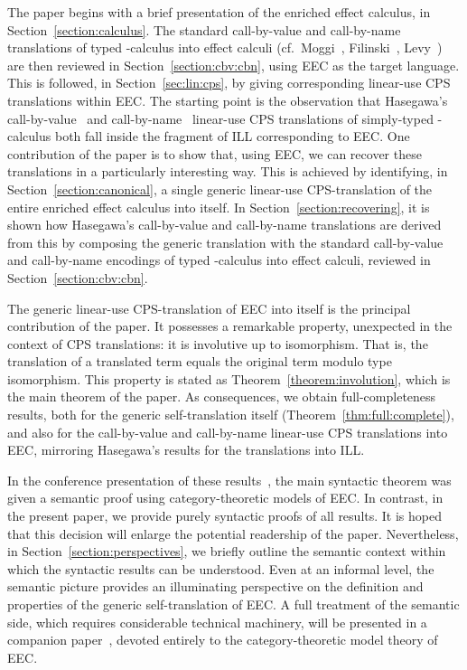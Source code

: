 \documentclass{LMCS}
\begin{document}
The paper 
begins with a brief presentation of the enriched effect
calculus, in Section~\ref{section:calculus}. 
The standard call-by-value and call-by-name translations of typed -calculus
into effect calculi (cf.~Moggi~\cite{Moggi:91},
Filinski~\cite{Filinski:phd}, Levy~\cite{Levy:book})
are then reviewed in Section~\ref{section:cbv:cbn},
using EEC as the target language.
This is followed, in Section~\ref{sec:lin:cps}, by giving corresponding
linear-use CPS translations within EEC.
The starting point is the observation that Hasegawa's
call-by-value~\cite{Hasegawa:Flops:02} 
and call-by-name~\cite{Hasegawa:Flops:04} 
linear-use CPS translations of simply-typed -calculus both
fall inside the fragment of ILL corresponding to EEC. 
One contribution of the paper is to show that, 
using EEC, we can recover these translations in a particularly
interesting way. 
This is achieved by identifying, in Section~\ref{section:canonical}, a single generic linear-use
CPS-translation of the entire enriched effect calculus into itself.
In Section~\ref{section:recovering}, it is shown how
Hasegawa's call-by-value and call-by-name translations are derived
from this by composing the generic translation with the standard  
call-by-value and call-by-name encodings of typed -calculus
into effect calculi, reviewed in Section~\ref{section:cbv:cbn}.

The generic linear-use CPS-translation of EEC into itself
is the principal contribution of the paper. It
possesses a remarkable property, unexpected in the context of
CPS translations: it is involutive up to isomorphism. 
That is, the translation of a translated term equals
the original term modulo type isomorphism. 
This property is stated as Theorem~\ref{theorem:involution}, 
which is the main theorem of the paper. 
As consequences, we obtain full-completeness results, both for
the generic self-translation itself (Theorem~\ref{thm:full:complete}),
and also for the
call-by-value and call-by-name linear-use CPS translations
into EEC, mirroring Hasegawa's results for 
the translations into ILL. 

In the conference presentation of these results~\cite{EMS:fossacs},
the main syntactic theorem was given a semantic proof using  
category-theoretic models of EEC. In contrast, 
in the present paper, we provide purely syntactic proofs of all results.
It is hoped that this decision  will enlarge the potential readership of
the paper. Nevertheless, in Section~\ref{section:perspectives}, we briefly
outline the semantic context within which the syntactic results can be understood.
Even at an informal level, the semantic picture  provides an illuminating perspective
on the definition and properties of the generic self-translation of EEC.
A full treatment of the semantic side, which requires
considerable technical machinery, will be presented in a 
companion paper~\cite{EMSc}, devoted entirely to the category-theoretic model
theory of EEC. 
\end{document}
